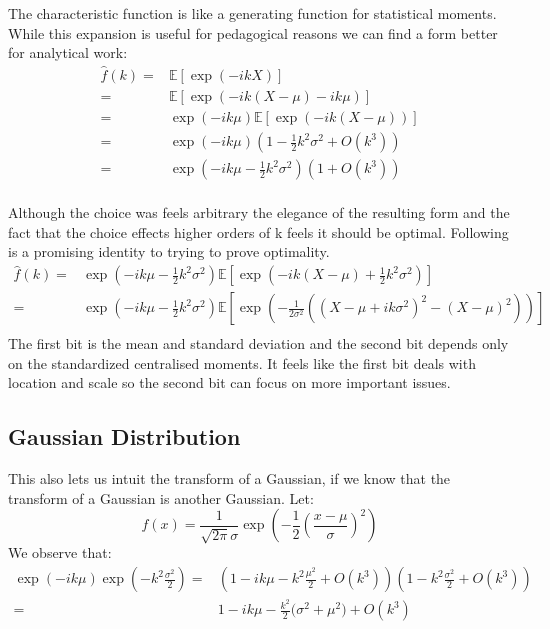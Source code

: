 The characteristic function is like a generating function for statistical moments.
While this expansion is useful for pedagogical reasons we can find a form better for analytical work:
\begin{equation*}
\begin{aligned}
\hat{f}(k) =& \mathbb{E}[\exp(-ikX)]\\
=& \mathbb{E}\left[\exp\left(-ik(X-\mu)-ik\mu\right)\right]\\
=& \exp\left(-ik\mu\right)\mathbb{E}\left[\exp\left(-ik(X-\mu)\right)\right]\\
=& \exp\left(-ik\mu\right)\left(1-\frac{1}{2}k^2\sigma^2+O(k^3)\right)\\
=& \exp\left(-ik\mu-\frac{1}{2}k^2\sigma^2\right)\left(1+O(k^3)\right)\\
\end{aligned}
\end{equation*}

Although the choice was feels arbitrary the elegance of the resulting form and the fact that the choice effects higher orders of k feels it should be optimal.
Following is a promising identity to trying to prove optimality. 
\begin{equation*}
\begin{aligned}
\hat{f}(k)=& \exp\left(-ik\mu-\frac{1}{2}k^2\sigma^2\right)\mathbb{E}\left[\exp\left(-ik(X-\mu)+\frac{1}{2}k^2\sigma^2\right)\right]\\
=& \exp\left(-ik\mu-\frac{1}{2}k^2\sigma^2\right)\mathbb{E}\left[\exp\left(-\frac{1}{2\sigma^2}\left((X-\mu+ik\sigma^2)^2-(X-\mu)^2\right)\right)\right]\\
\end{aligned}
\end{equation*}
The first bit is the mean and standard deviation and the second bit depends only on the standardized centralised moments.
It feels like the first bit deals with location and scale so the second bit can focus on more important issues.

\subsection{Gaussian Distribution}
This also lets us intuit the transform of a Gaussian, if we know that the transform of a Gaussian is another Gaussian.
Let:
\[f(x) = \frac{1}{\sqrt{2\pi}\sigma}\exp\left(-\frac{1}{2}\left(\frac{x-\mu}{\sigma}\right)^2\right)\]
We observe that:
\begin{equation*}
\begin{aligned}
\exp(-ik\mu)\exp\left(-k^2\frac{\sigma^2}{2}\right) =& \left(1-ik\mu -k^2\frac{\mu^2}{2} + O(k^3)\right)\left(1-k^2\frac{\sigma^2}{2}+O(k^3)\right)\\
	=&1-ik\mu-\frac{k^2}{2}\big(\sigma^2+\mu^2\big) + O(k^3)\\
\end{aligned}
\end{equation*}

